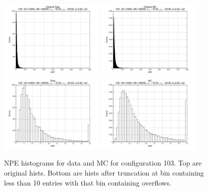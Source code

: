  \begin{figure}[htbp] \begin{center} 
\includegraphics[width=0.45\textwidth]{../FIGURES/103/FIG_Original_Data.pdf} 
\includegraphics[width=0.45\textwidth]{../FIGURES/103/FIG_Original_MC.pdf} 
\includegraphics[width=0.45\textwidth]{../FIGURES/103/FIG_Data.pdf} 
\includegraphics[width=0.45\textwidth]{../FIGURES/103/FIG_MC.pdf} 
\caption{NPE histograms for data and MC for configuration 103. Top are original hists. Bottom are hists after truncation at bin containing less than 10 entries with that bin containing overflows.} 
\label{tab:npe_103} 
\end{center} \end{figure} 
\clearpage
 